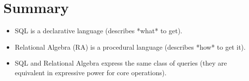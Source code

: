 \documentclass{article}
\begin{document}
\section*{Summary} 
\begin{itemize}
    \item SQL is a declarative language (describes *what* to get). 
    \item Relational Algebra (RA) is a procedural language (describes *how* to get it). 
    \item SQL and Relational Algebra express the same class of queries (they are equivalent in expressive power for core operations). 
\end{itemize}
\end{document}
